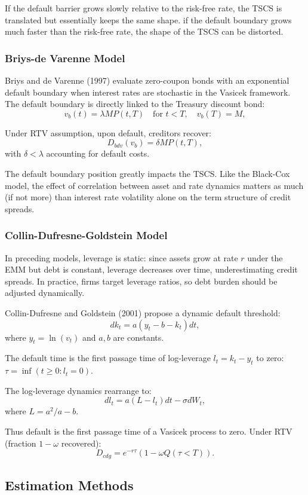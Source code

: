 \documentclass[12pt,a4paper]{article}
\begin{document}
If the default barrier grows slowly relative to the risk-free rate, the TSCS is translated 
but essentially keeps the same shape. if the default boundary grows much faster than the risk-free rate, the shape of the TSCS 
can be distorted.

\subsubsection{Briys-de Varenne Model}

Briys and de Varenne (1997) evaluate zero-coupon bonds with an exponential default boundary when interest rates are stochastic in the Vasicek framework. The default boundary is directly linked to the Treasury discount bond:
$$v_b(t) = \lambda MP(t,T) \quad \text{for } t < T, \quad v_b(T) = M,$$

Under RTV assumption, upon default, creditors recover:
$$D_{bdv}(v_b) = \delta MP(t,T),$$
with $\delta < \lambda$ accounting for default costs.

The default boundary position greatly impacts the TSCS. Like the Black-Cox model, the effect of correlation between asset and rate dynamics matters as much (if not more) than interest rate volatility alone on the term structure of credit spreads.

\subsubsection{Collin-Dufresne-Goldstein Model }

In preceding models, leverage is static: since assets grow at rate $r$ under the EMM but debt is constant, leverage decreases over time, underestimating credit spreads. In practice, firms target leverage ratios, so debt burden should be adjusted dynamically.

Collin-Dufresne and Goldstein (2001) propose a dynamic default threshold:
$$dk_t = a(y_t - b - k_t)dt,$$
where $y_t = \ln(v_t)$ and $a, b$ are constants.

The default time is the first passage time of log-leverage $l_t = k_t - y_t$ to zero: $\tau = \inf(t \geq 0: l_t = 0)$.

The log-leverage dynamics rearrange to:
$$dl_t = a(L - l_t)dt - \sigma dW_t,$$
where $L = a^2/a - b$.

Thus default is the first passage time of a Vasicek process to zero. Under RTV (fraction $1-\omega$ recovered):
$$D_{cdg} = e^{-r\tau}(1 - \omega Q(\tau < T)).$$

\subsection{Estimation Methods}
\end{document}
